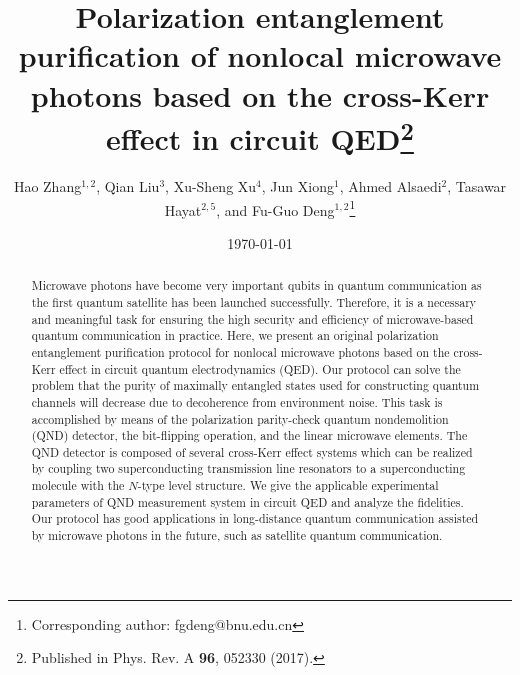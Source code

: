\documentclass[showpacs,aps,graphicx,twocolumn]{revtex4}
\begin{document}

\title{Polarization entanglement purification of nonlocal microwave photons
based on the cross-Kerr effect in circuit QED\footnote{Published in
Phys. Rev. A \textbf{96}, 052330 (2017).}}

\author{Hao Zhang$^{1,2}$, Qian Liu$^{3}$, Xu-Sheng Xu$^{4}$,
Jun Xiong$^{1}$, Ahmed Alsaedi$^{2}$, Tasawar  Hayat$^{2,5}$, and
Fu-Guo Deng$^{1,2}$\footnote{Corresponding author:
fgdeng@bnu.edu.cn}}

\address{$^{1}$Department of Physics, Applied Optics Beijing Area Major Laboratory,
Beijing Normal University, Beijing 100875, China\\
$^{2}$NAAM Research Group, Department of Mathematics, King Abdulaziz
University, Jeddah 21589, Saudi Arabia\\
$^{3}$School of Sciences, Qingdao University of Technology, Qingdao 266033, China\\
$^{4}$State Key Laboratory of Low-Dimensional Quantum Physics and
Department of Physics,
Tsinghua University, Beijing 100084, China\\
$^{5}$Department of Mathematics, Quaid-I-Azam University, Islamabad
44000, Pakistan }



\date{\today}


\begin{abstract}
Microwave photons have become very important qubits in quantum
communication as the first quantum satellite has been launched
successfully. Therefore, it is a necessary and meaningful task for
ensuring the high security and efficiency of microwave-based quantum
communication in practice. Here, we present an original polarization
entanglement purification protocol for nonlocal microwave
photons based on the cross-Kerr effect in circuit quantum
electrodynamics (QED). Our protocol can solve the problem that the
purity of maximally entangled states used for constructing quantum
channels will decrease due to decoherence from environment noise.
This task is accomplished by means of the polarization parity-check
quantum nondemolition (QND) detector, the bit-flipping operation,
and the linear microwave elements. The QND detector is composed of
several cross-Kerr effect systems which can be realized by coupling
two superconducting transmission line resonators to a
superconducting molecule with the $N$-type level structure.
We give the applicable experimental parameters of QND measurement system in circuit QED and analyze the fidelities.
Our protocol has good applications in long-distance quantum communication assisted by microwave photons in
the future, such as satellite quantum communication.
\end{abstract}
\end{document}
